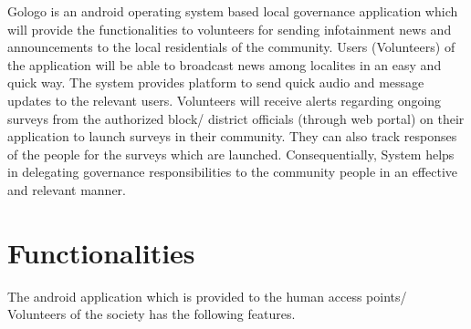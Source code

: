 Gologo is an android operating system based local governance application which will provide the functionalities to volunteers for sending infotainment news and announcements to the local residentials of the community. Users (Volunteers) of the application will be able to broadcast news among localites in an easy and quick way.  The system provides platform to send quick audio and message updates to the relevant users. Volunteers will receive alerts regarding ongoing surveys from the authorized block/ district officials (through web portal)  on their application to launch surveys in their community. They can also track responses of the people for the surveys which are launched. Consequentially, System helps in delegating governance responsibilities to the community people in an effective and relevant manner.

\section {Functionalities}
The android application which is provided to the human access points/ Volunteers of the society has the following features.

